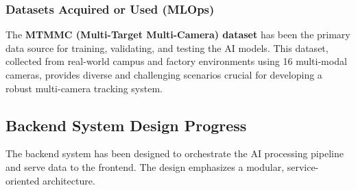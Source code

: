 \subsubsection*{Datasets Acquired or Used (MLOps)}
The \textbf{MTMMC (Multi-Target Multi-Camera) dataset} has been the primary data source for training, validating, and testing the AI models. This dataset, collected from real-world campus and factory environments using 16 multi-modal cameras, provides diverse and challenging scenarios crucial for developing a robust multi-camera tracking system.

\subsection*{Backend System Design Progress}
\label{subsec:progress_backend}
The backend system has been designed to orchestrate the AI processing pipeline and serve data to the frontend. The design emphasizes a modular, service-oriented architecture.

